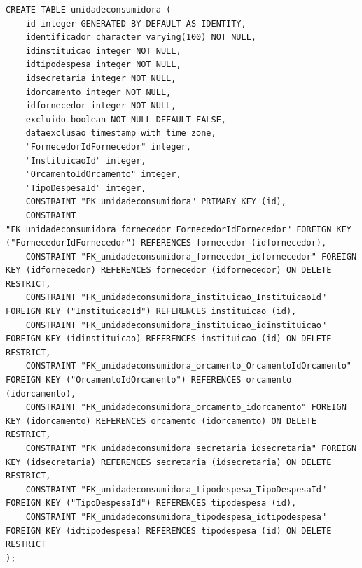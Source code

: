 \begin{quadro}[H]
\caption{Script SQL — Tabela unidadeconsumidora}
\label{qua:script-unidadeconsumidora}
\begin{minipage}{0.96\textwidth}
\begin{lstlisting}[style=academic-sql]
CREATE TABLE unidadeconsumidora (
    id integer GENERATED BY DEFAULT AS IDENTITY,
    identificador character varying(100) NOT NULL,
    idinstituicao integer NOT NULL,
    idtipodespesa integer NOT NULL,
    idsecretaria integer NOT NULL,
    idorcamento integer NOT NULL,
    idfornecedor integer NOT NULL,
    excluido boolean NOT NULL DEFAULT FALSE,
    dataexclusao timestamp with time zone,
    "FornecedorIdFornecedor" integer,
    "InstituicaoId" integer,
    "OrcamentoIdOrcamento" integer,
    "TipoDespesaId" integer,
    CONSTRAINT "PK_unidadeconsumidora" PRIMARY KEY (id),
    CONSTRAINT "FK_unidadeconsumidora_fornecedor_FornecedorIdFornecedor" FOREIGN KEY ("FornecedorIdFornecedor") REFERENCES fornecedor (idfornecedor),
    CONSTRAINT "FK_unidadeconsumidora_fornecedor_idfornecedor" FOREIGN KEY (idfornecedor) REFERENCES fornecedor (idfornecedor) ON DELETE RESTRICT,
    CONSTRAINT "FK_unidadeconsumidora_instituicao_InstituicaoId" FOREIGN KEY ("InstituicaoId") REFERENCES instituicao (id),
    CONSTRAINT "FK_unidadeconsumidora_instituicao_idinstituicao" FOREIGN KEY (idinstituicao) REFERENCES instituicao (id) ON DELETE RESTRICT,
    CONSTRAINT "FK_unidadeconsumidora_orcamento_OrcamentoIdOrcamento" FOREIGN KEY ("OrcamentoIdOrcamento") REFERENCES orcamento (idorcamento),
    CONSTRAINT "FK_unidadeconsumidora_orcamento_idorcamento" FOREIGN KEY (idorcamento) REFERENCES orcamento (idorcamento) ON DELETE RESTRICT,
    CONSTRAINT "FK_unidadeconsumidora_secretaria_idsecretaria" FOREIGN KEY (idsecretaria) REFERENCES secretaria (idsecretaria) ON DELETE RESTRICT,
    CONSTRAINT "FK_unidadeconsumidora_tipodespesa_TipoDespesaId" FOREIGN KEY ("TipoDespesaId") REFERENCES tipodespesa (id),
    CONSTRAINT "FK_unidadeconsumidora_tipodespesa_idtipodespesa" FOREIGN KEY (idtipodespesa) REFERENCES tipodespesa (id) ON DELETE RESTRICT
);
\end{lstlisting}
\end{minipage}
\end{quadro}

